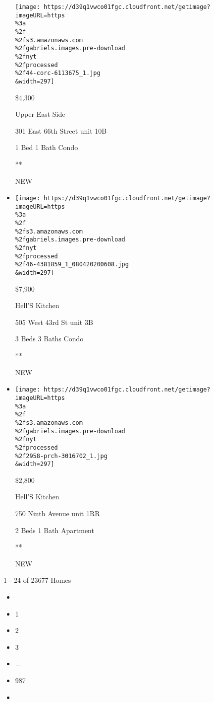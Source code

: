 \begin{itemize}
  \texttt{[image: https://d39q1vwco01fgc.cloudfront.net/getimage?imageURL=https\\\%3a\\\%2f\\\%2fs3.amazonaws.com\\\%2fgabriels.images.pre-download\\\%2fnyt\\\%2fprocessed\\\%2f44-corc-6113675\_1.jpg\\\&width=297]}

  \$4,300

  Upper East Side

  301 East 66th Street unit 10B

  1 Bed \textbar{} 1 Bath \textbar{} Condo

  **

  NEW
\item
  \href{/real-estate/usa/ny/new-york/hells-kitchen/homes-for-rent/505-west-43rd-st/46-4381859?}{}

  \texttt{[image: https://d39q1vwco01fgc.cloudfront.net/getimage?imageURL=https\\\%3a\\\%2f\\\%2fs3.amazonaws.com\\\%2fgabriels.images.pre-download\\\%2fnyt\\\%2fprocessed\\\%2f46-4381859\_1\_080420200608.jpg\\\&width=297]}

  \$7,900

  Hell'S Kitchen

  505 West 43rd St unit 3B

  3 Beds \textbar{} 3 Baths \textbar{} Condo

  **

  NEW
\item
  \href{/real-estate/usa/ny/new-york/hells-kitchen/homes-for-rent/750-ninth-avenue/2958-PRCH-3016702?}{}

  \texttt{[image: https://d39q1vwco01fgc.cloudfront.net/getimage?imageURL=https\\\%3a\\\%2f\\\%2fs3.amazonaws.com\\\%2fgabriels.images.pre-download\\\%2fnyt\\\%2fprocessed\\\%2f2958-prch-3016702\_1.jpg\\\&width=297]}

  \$2,800

  Hell'S Kitchen

  750 Ninth Avenue unit 1RR

  2 Beds \textbar{} 1 Bath \textbar{} Apartment

  **

  NEW
\end{itemize}

1 - 24 of 23677 Homes

\begin{itemize}
\item
\item
  1
\item
  2
\item
  3
\item
  ...
\item
  987
\item
\end{itemize}

